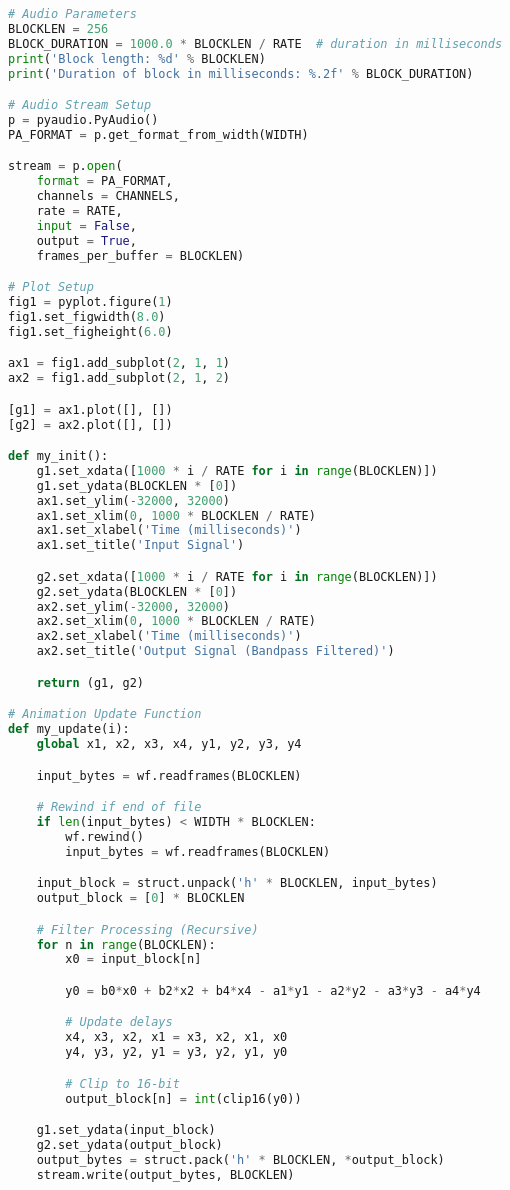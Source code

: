 \documentclass[11pt]{article}
\begin{document}
\begin{lstlisting}[language=python, label={lst:code}, breaklines=true, caption={Full implementation}]
# Audio Parameters
BLOCKLEN = 256
BLOCK_DURATION = 1000.0 * BLOCKLEN / RATE  # duration in milliseconds
print('Block length: %d' % BLOCKLEN)
print('Duration of block in milliseconds: %.2f' % BLOCK_DURATION)

# Audio Stream Setup
p = pyaudio.PyAudio()
PA_FORMAT = p.get_format_from_width(WIDTH)

stream = p.open(
    format = PA_FORMAT,
    channels = CHANNELS,
    rate = RATE,
    input = False,
    output = True,
    frames_per_buffer = BLOCKLEN)

# Plot Setup
fig1 = pyplot.figure(1)
fig1.set_figwidth(8.0)
fig1.set_figheight(6.0)

ax1 = fig1.add_subplot(2, 1, 1)
ax2 = fig1.add_subplot(2, 1, 2)

[g1] = ax1.plot([], [])
[g2] = ax2.plot([], [])

def my_init():
    g1.set_xdata([1000 * i / RATE for i in range(BLOCKLEN)])
    g1.set_ydata(BLOCKLEN * [0])
    ax1.set_ylim(-32000, 32000)
    ax1.set_xlim(0, 1000 * BLOCKLEN / RATE)
    ax1.set_xlabel('Time (milliseconds)')
    ax1.set_title('Input Signal')

    g2.set_xdata([1000 * i / RATE for i in range(BLOCKLEN)])
    g2.set_ydata(BLOCKLEN * [0])
    ax2.set_ylim(-32000, 32000)
    ax2.set_xlim(0, 1000 * BLOCKLEN / RATE)
    ax2.set_xlabel('Time (milliseconds)')
    ax2.set_title('Output Signal (Bandpass Filtered)')

    return (g1, g2)

# Animation Update Function
def my_update(i):
    global x1, x2, x3, x4, y1, y2, y3, y4

    input_bytes = wf.readframes(BLOCKLEN)

    # Rewind if end of file
    if len(input_bytes) < WIDTH * BLOCKLEN:
        wf.rewind()
        input_bytes = wf.readframes(BLOCKLEN)

    input_block = struct.unpack('h' * BLOCKLEN, input_bytes)
    output_block = [0] * BLOCKLEN

    # Filter Processing (Recursive)
    for n in range(BLOCKLEN):
        x0 = input_block[n]

        y0 = b0*x0 + b2*x2 + b4*x4 - a1*y1 - a2*y2 - a3*y3 - a4*y4

        # Update delays
        x4, x3, x2, x1 = x3, x2, x1, x0
        y4, y3, y2, y1 = y3, y2, y1, y0

        # Clip to 16-bit
        output_block[n] = int(clip16(y0))

    g1.set_ydata(input_block)
    g2.set_ydata(output_block)
    output_bytes = struct.pack('h' * BLOCKLEN, *output_block)
    stream.write(output_bytes, BLOCKLEN)


\end{lstlisting}
\end{document}
